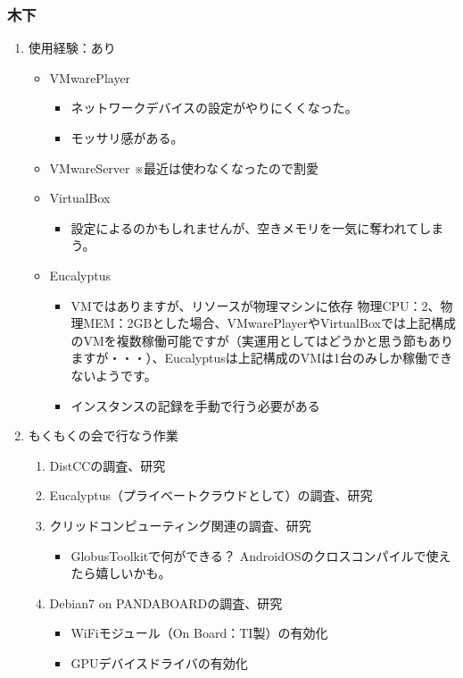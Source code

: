 \documentclass[cjk,dvipdfmx,10pt,compress,%
hyperref={bookmarks=true,bookmarksnumbered=true,bookmarksopen=false,%
colorlinks=false,%
pdftitle={第 82 回 関西 Debian 勉強会},%
pdfauthor={倉敷・のがた・佐々木・かわだ・八津尾},%
pdfsubject={資料},%
}]{beamer}
\begin{document}
\begin{frame}
  \frametitle{ 木下 }
  \begin{enumerate}
  \item 使用経験：あり

    \begin{itemize}
    \item VMwarePlayer
      \begin{itemize}
      \item ネットワークデバイスの設定がやりにくくなった。
      \item モッサリ感がある。
      \end{itemize}
    \item VMwareServer ※最近は使わなくなったので割愛
    \item VirtualBox
      \begin{itemize}
      \item 設定によるのかもしれませんが、空きメモリを一気に奪われてしまう。
      \end{itemize}
    \item Eucalyptus
      \begin{itemize}
      \item VMではありますが、リソースが物理マシンに依存
        物理CPU：2、物理MEM：2GBとした場合、VMwarePlayerやVirtualBoxでは上記構成のVMを複数稼働可能ですが（実運用としてはどうかと思う節もありますが・・・）、Eucalyptusは上記構成のVMは1台のみしか稼働できないようです。
      \item インスタンスの記録を手動で行う必要がある
      \end{itemize}
    \end{itemize}

  \item もくもくの会で行なう作業

    \begin{enumerate}
    \item DistCCの調査、研究
    \item Eucalyptus（プライベートクラウドとして）の調査、研究
    \item クリッドコンピューティング関連の調査、研究
      \begin{itemize}
      \item GlobusToolkitで何ができる？
        AndroidOSのクロスコンパイルで使えたら嬉しいかも。
      \end{itemize}
    \item Debian7 on PANDABOARDの調査、研究
      \begin{itemize}
      \item WiFiモジュール（On Board：TI製）の有効化
      \item GPUデバイスドライバの有効化
      \end{itemize}
    \end{enumerate}


\end{enumerate}
\end{frame}
\end{document}
